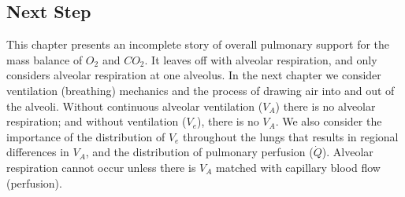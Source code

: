 \subsection{Next Step}

This chapter presents an incomplete story of overall pulmonary support for the mass balance of $O_2$ and $CO_2$. It leaves off with alveolar respiration, and only considers alveolar respiration at one alveolus. In the next chapter we consider ventilation (breathing) mechanics and the process of drawing air into and out of the alveoli. Without continuous alveolar ventilation ($V_A$) there is no alveolar respiration; and without ventilation ($V_e$), there is no $V_A$. We also consider the importance of the distribution of $V_e$ throughout the lungs that results in regional differences in $V_A$, and the distribution of pulmonary perfusion ($\dot{Q}$). Alveolar respiration cannot occur unless there is $V_A$ matched with capillary blood flow (perfusion). 


\printbibliography[heading=subbibintoc]